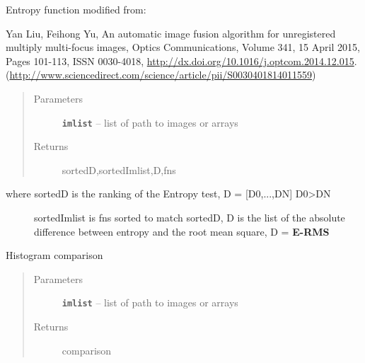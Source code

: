 \documentclass[letterpaper,10pt,english]{sphinxmanual}
\begin{document}

\begin{fulllineitems}
\label{RRtoolbox.tools:RRtoolbox.tools.selectors.entropy}
Entropy function modified from:

Yan Liu, Feihong Yu, An automatic image fusion algorithm for unregistered multiply multi-focus images,
Optics Communications, Volume 341, 15 April 2015, Pages 101-113, ISSN 0030-4018,
\href{http://dx.doi.org/10.1016/j.optcom.2014.12.015}{http://dx.doi.org/10.1016/j.optcom.2014.12.015}.
(\href{http://www.sciencedirect.com/science/article/pii/S0030401814011559}{http://www.sciencedirect.com/science/article/pii/S0030401814011559})
\begin{quote}\begin{description}
\item[{Parameters}] \leavevmode
\textbf{\texttt{imlist}} -- list of path to images or arrays

\item[{Returns}] \leavevmode
sortedD,sortedImlist,D,fns

\end{description}\end{quote}
\begin{description}
\item[{where sortedD is the ranking of the Entropy test, D = {[}D0,...,DN{]} D0\textgreater{}DN}] \leavevmode
sortedImlist is fns sorted to match sortedD,
D is the list of the absolute difference between entropy and the root mean square, D = {\color{red}\bfseries{}\textbar{}E-RMS\textbar{}}

\end{description}

\end{fulllineitems}


\begin{fulllineitems}
\label{RRtoolbox.tools:RRtoolbox.tools.selectors.hist_comp}
Histogram comparison
\begin{quote}\begin{description}
\item[{Parameters}] \leavevmode
\textbf{\texttt{imlist}} -- list of path to images or arrays

\item[{Returns}] \leavevmode
comparison

\end{description}\end{quote}

\end{fulllineitems}
\end{document}
